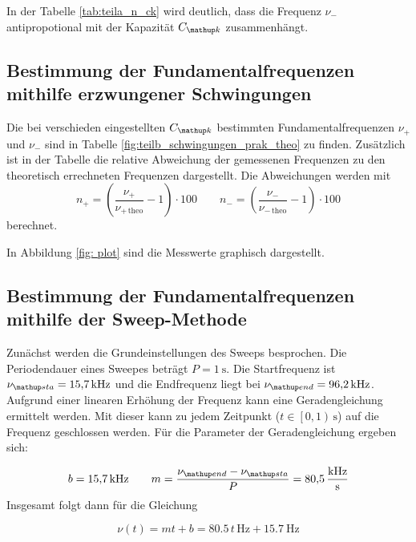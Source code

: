 %


In der Tabelle \ref{tab:teila_n_ck} wird deutlich, dass die Frequenz $\nu_-$ antipropotional
mit der Kapazität $C\ua{k}$ zusammenhängt.

\subsection{Bestimmung der Fundamentalfrequenzen mithilfe erzwungener Schwingungen}
Die bei verschieden eingestellten $C\ua{k}$ bestimmten Fundamentalfrequenzen
$\nu_+$ und $\nu_-$
sind in Tabelle \ref{fig:teilb_schwingungen_prak_theo} zu finden.
Zusätzlich ist in der Tabelle die relative Abweichung der gemessenen Frequenzen
zu den theoretisch errechneten Frequenzen dargestellt.
Die Abweichungen werden mit
\begin{equation}
\label{eq:verh}
n_+=\left(\frac{\nu_+}{\nu_{+\,\mathup{theo}}}-1\right)\cdot 100 \qquad n_-=\left(\frac{\nu_-}{\nu_{-\,\mathup{theo}}}-1\right)\cdot100
\end{equation}
berechnet.
\FloatBarrier

\FloatBarrier
In Abbildung \ref{fig: plot} sind die Messwerte graphisch dargestellt. %

\subsection{Bestimmung der Fundamentalfrequenzen mithilfe der Sweep-Methode}
Zunächst werden die Grundeinstellungen des Sweeps besprochen.
Die Periodendauer eines Sweepes beträgt $P=\SI{1}{\second}$.
Die Startfrequenz ist $\nu\ua{sta}=\SI{15.7}{\kilo\hertz}$ und die
Endfrequenz liegt bei $\nu\ua{end}=\SI{96.2}{\kilo\hertz}$.
Aufgrund einer linearen Erhöhung der Frequenz kann eine Geradengleichung ermittelt werden.
Mit dieser kann zu jedem Zeitpunkt ($t\in\left[0,1\right)\,\si{\second}$) auf die Frequenz geschlossen werden.
Für die Parameter der Geradengleichung ergeben sich:

\begin{equation*}
b=\SI{15.7}{\kilo\hertz} \qquad m=\frac{\nu\ua{end}-\nu\ua{sta}}{P}=\SI{80.5}{\kilo\hertz\per\second}
\end{equation*}
Insgesamt folgt dann für die Gleichung %

\begin{equation}
\label{eq:geraden}
\nu(t)=mt+b=80.5\,t\,\si{\hertz}+\SI{15.7}{\hertz}
\end{equation}


